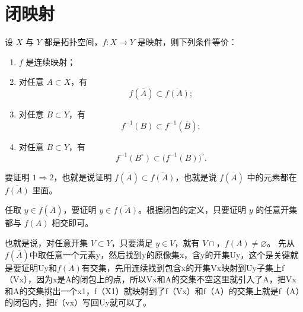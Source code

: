 \section{闭映射}
\begin{theorem}[定理 3.2（连续映射和集运算的性质）]
设 $X$ 与 $Y$ 都是拓扑空间，$f:X\to Y$ 是映射，则下列条件等价：
\begin{enumerate}
  \item $f$ 是连续映射；
  \item 对任意 $A\subset X$，有
  \[
  f(\overline A)\subset \overline{f(A)};
  \]
  \item 对任意 $B\subset Y$，有
  \[
  f^{-1}(B)\subset f^{-1}(\overline B);
  \]
  \item 对任意 $B\subset Y$，有
  \[
  f^{-1}(B^\circ)\subset \bigl(f^{-1}(B)\bigr)^\circ.
  \]
\end{enumerate}

\end{theorem}
\begin{dxtips}
要证明 $1\Rightarrow 2$，也就是说证明 $f(\overline A)\subset \overline{f(A)}$，也就是说 $f(\overline A)$ 中的元素都在 $\overline{f(A)}$ 里面。

任取 $y\in f(\overline A)$，要证明 $y\in\overline{f(A)}$。根据闭包的定义，只要证明 $y$ 的任意开集都与 $f(A)$ 相交即可。

也就是说，对任意开集 $V\subset Y$，只要满足 $y\in V$，就有 $V\cap ，f(A)\neq\varnothing$。 
先从$f(\overline A)$中取任意一个元素y，然后找到y的原像集x，含y的开集Uy，这个是关键就是要证明Uy和$\overline{f(A)}$有交集，先用连续找到包含x的开集Vx映射到Uy子集上f（Vx），因为x是A的闭包上的点，所以Vx和A的交集不空这里就引入了A，把Vx和A的交集挑出一个x1，f（X1）就映射到了f（Vx）和f（A）的交集上就是f（A）的闭包内，把f（vx）写回Uy就可以了。
\end{dxtips}
